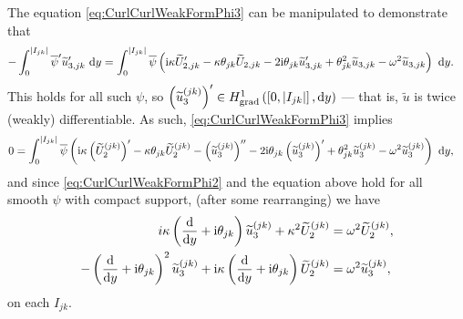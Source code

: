 \documentclass[11pt]{report}
\begin{document}
The equation \eqref{eq:CurlCurlWeakFormPhi3} can be manipulated to demonstrate that
\begin{align*}
	-\int_0^{\left\lvert I_{jk} \right\rvert} \overline{\psi}' \widetilde{u}'_{3,jk} \ \mathrm{d} y
	&= \int_0^{\left\lvert I_{jk} \right\rvert} \overline{\psi} \left(  \mathrm{i}\kappa\widetilde{U}'_{2,jk} - \kappa\theta_{jk}\widetilde{U}_{2,jk} - 2\mathrm{i}\theta_{jk}\widetilde{u}'_{3,jk} + \theta_{jk}^2\widetilde{u}_{3,jk} - \omega^2\widetilde{u}_{3,jk}  \right) \ \mathrm{d} y.
\end{align*}
This holds for all such $\psi$, so $\left( \widetilde{u}_3^{(jk)} \right)'\in H^1_\mathrm{grad}\left( \left[ 0,\left\lvert I_{jk} \right\rvert \right], \mathrm{d}y \right)$  --- that is, $\widetilde{u}$ is twice (weakly) differentiable.
As such, \eqref{eq:CurlCurlWeakFormPhi3} implies
\begin{align*}
	0 &= \int_0^{\abs{I_{jk}}} \overline{\psi} \bracs{ \rmi\wavenumber\bracs{\widetilde{U}_2^{(jk)}}' - \wavenumber\qm_{jk}\widetilde{U}_2^{(jk)} - \bracs{\widetilde{u}_3^{(jk)}}'' - 2\rmi\qm_{jk}\bracs{\widetilde{u}_3^{(jk)}}' + \qm_{jk}^2\widetilde{u}_3^{(jk)} - \omega^2\widetilde{u}_3^{(jk)} } \ \md y,
\end{align*}
and since \eqref{eq:CurlCurlWeakFormPhi2} and the equation above hold for all smooth $\psi$ with compact support, (after some rearranging) we have
\begin{subequations} \label{eq:QGPhiStandalone}
	\begin{align}
		i\kappa \left(  \dfrac{\mathrm{d}}{\mathrm{d}y} + \mathrm{i}\theta_{jk}  \right)\widetilde{u}_3^{(jk)} + \kappa^2\widetilde{U}_2^{(jk)} &= \omega^2\widetilde{U}_2^{(jk)}, \label{eq:QGPhi2Standalone} \\
		-\left(  \dfrac{\mathrm{d}}{\mathrm{d}y} + \mathrm{i}\theta_{jk}  \right)^2\widetilde{u}_3^{(jk)} + \mathrm{i}\kappa\left(  \dfrac{\mathrm{d}}{\mathrm{d}y} + \mathrm{i}\theta_{jk}  \right)\widetilde{U}_2^{(jk)} &= \omega^2 \widetilde{u}_3^{(jk)}, \label{eq:QGPhi3Standalone}
	\end{align}
\end{subequations}
on each $I_{jk}$. \newline
\end{document}
